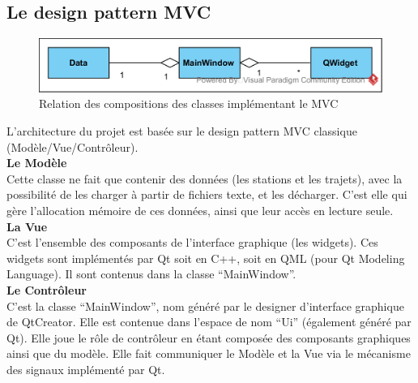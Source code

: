 \documentclass[12pt]{article}
\begin{document}
		\subsection{Le design pattern MVC}		
		\begin{figure}[!h]
		\begin{center}
		\includegraphics[scale=1]{dia_class_mvc.png}
		\caption{Relation des compositions des classes implémentant le MVC}
		\end{center}
		\end{figure}		
		
		L’architecture du projet est basée sur le design pattern MVC classique
		(Modèle/Vue/Contrôleur).\\
		
		\textbf{Le Modèle}\\
		Cette classe ne fait
		que contenir des données (les stations et les trajets), avec la possibilité de les
		charger à partir de fichiers texte, et les décharger. C’est elle qui gère
		l’allocation mémoire de ces données, ainsi que leur accès en lecture seule.\\
		
		\textbf{La Vue}\\
		C’est l’ensemble des composants de l’interface graphique (les widgets). Ces widgets
		sont implémentés par Qt soit en C++, soit en QML (pour Qt Modeling Language). Il sont
		contenus dans la classe “MainWindow”.\\
				
		\textbf{Le Contrôleur}\\
		C’est la classe “MainWindow”, nom généré par le designer d’interface graphique de
		QtCreator. Elle est contenue dans l’espace de nom “Ui” (également généré par Qt).
		Elle joue le rôle de contrôleur en étant composée des composants graphiques ainsi que
		du modèle. Elle fait communiquer le Modèle et la Vue via le mécanisme des signaux
		implémenté par Qt.\\
			
\end{document}
